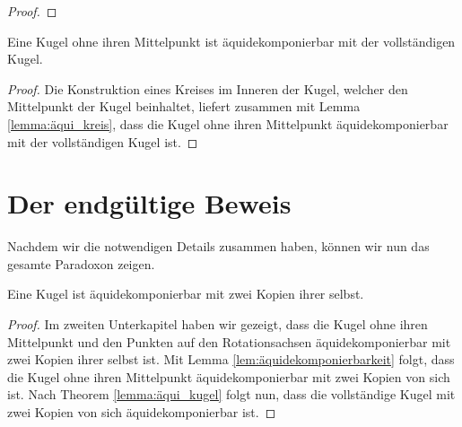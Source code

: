\begin{lemma} 
\label{lemma:equi_subset}
\leanok
{}
\end{lemma}
\begin{proof}
\end{proof}

\begin{theorem} \label{theorem:aequi_kugel}
Eine Kugel ohne ihren Mittelpunkt ist äquidekomponierbar mit der vollständigen Kugel.
 \leanok
\end{theorem}
\begin{proof} 
Die Konstruktion eines Kreises im Inneren der Kugel, welcher den Mittelpunkt der Kugel beinhaltet, liefert zusammen mit Lemma \ref{lemma:äqui_kreis},
dass die Kugel ohne ihren Mittelpunkt äquidekomponierbar mit der vollständigen Kugel ist.
\end{proof}

\section{Der endgültige Beweis}

Nachdem wir die notwendigen Details zusammen haben, können wir nun das gesamte Paradoxon zeigen.
\begin{theorem}\label{thm:BanachTarski}
Eine Kugel ist äquidekomponierbar mit zwei Kopien ihrer selbst.
\end{theorem}
\begin{proof} 
Im zweiten Unterkapitel haben wir gezeigt, dass die Kugel ohne ihren Mittelpunkt und den Punkten auf den Rotationsachsen äquidekomponierbar
mit zwei Kopien ihrer selbst ist. Mit Lemma \ref{lem:äquidekomponierbarkeit} folgt, dass die Kugel ohne ihren Mittelpunkt äquidekomponierbar
mit zwei Kopien von sich ist. Nach Theorem \ref{lemma:äqui_kugel} folgt nun, dass die vollständige Kugel mit zwei Kopien von sich äquidekomponierbar
ist.
\end{proof}